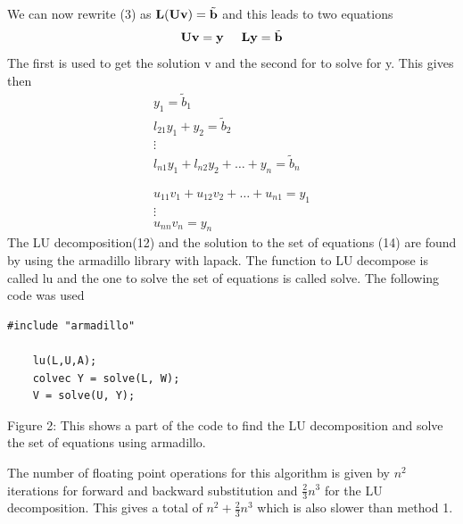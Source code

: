 \documentclass[11pt,a4wide]{article}
\begin{document}
We can now rewrite (3) as ${\bf L}({\bf U}{\bf v})= \tilde{{\bf b}}$ and this leads to two equations 
\begin{equation}
 {\bf U}{\bf v} ={\bf y} \hspace{0.5cm} {\bf L}{\bf y} =\tilde{{\bf b}}
\end{equation}
The first is used to get the solution v and the second for to solve for y. This gives then 
\begin{equation}
\begin{split}
 	y_1 = \tilde{b}_1 \\
 	l_{21}y_1 + y_2 = \tilde{b}_2\\
 	\vdots\\
 	l_{n1}y_1 + l_{n2}y_2 + \dots +y_n  =\tilde{b}_n \\
 	\\
 	\\
 	u_{11}v_1 +u_{12}v_2+\dots+u_{n1} =y_1\\
 	\vdots\\
	u_{nn}v_n = y_n  	
\end{split}
\end{equation}
The LU decomposition(12) and the solution to the set of equations (14) are found by using the armadillo library with lapack. 
The function to LU decompose is called lu and the one to solve the set of equations is called solve. The following code was used
\begin{lstlisting}[title={Project1}]
#include "armadillo"
  
    lu(L,U,A);
    colvec Y = solve(L, W);
    V = solve(U, Y);
\end{lstlisting}     
Figure 2: This shows a part of the code to find the LU decomposition and solve the set of equations using armadillo. 

The number of floating point operations for this algorithm is given by $n^2$ iterations for forward and backward substitution and
$\frac{2}{3}n^3$ for the LU decomposition. This gives a total of $n^2+\frac{2}{3}n^3$ which is also slower than method 1. 
\end{document}
